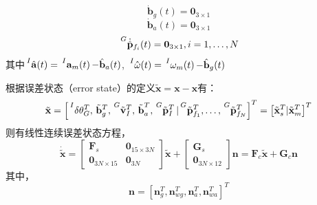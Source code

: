 \documentclass{article}
\begin{document}
\begin{equation}\label{eqs:sysmodel24}
    \dot{\mathbf{b}}_{g}(t)=\textbf{0}_{3\times 1}
\end{equation}
\begin{equation}\label{eqs:sysmodel25}
    \dot{\mathbf{b}}_{a}(t)=\textbf{0}_{3\times 1}
\end{equation}
\begin{equation}\label{eqs:sysmodel26}
    \sideset{^G}{}{\mathop{\dot{\hat{\mathbf{p}}}_{f_i}(t)}}=\textbf{0}_{3\times 1},i=1,\dots,N
\end{equation}
其中$\sideset{^I}{}{\mathop{\hat{\mathbf{a}}(t)}}=\sideset{^I}{}{\mathop{\mathbf{a}_{m}(t)}}-\hat{\mathbf{b}}_{a}(t)$,
$\sideset{^I}{}{\mathop{\hat{\mathbf{\omega}}(t)}}=\sideset{^I}{}{\mathop{\mathbf{\omega}_{m}(t)}}-\hat{\mathbf{b}}_{g}(t)$
\par
根据误差状态（error state）的定义$\tilde{\mathbf{x}}=\mathbf{x}-\hat{\mathbf{x}}$有：
\begin{equation}
    \tilde{\mathbf{x}}=\left[\sideset{^I}{}{\mathop{\delta{\mathbf{\theta}}_{G}^{T}}},
    \sideset{}{}{\mathop{\tilde{\mathbf{b}}_{g}^{T}}},
    \sideset{^G}{}{\mathop{\tilde{\textbf{v}}_{I}^{T}}},
    \sideset{}{}{\mathop{\tilde{\textbf{b}}_{a}^{T}}},
    \sideset{^G}{}{\mathop{\tilde{\textbf{p}}_{I}^{T}}}|
    \sideset{^G}{}{\mathop{\tilde{\textbf{p}}_{f_1}^{T}}},
    \dots,
    \sideset{^G}{}{\mathop{\tilde{\textbf{p}}_{f_N}^{T}}}
    \right]^T
    =\left[\tilde{\textbf{x}}_{s}^{T} | \tilde{\textbf{x}}_{m}^{T}\right]^T
\end{equation}
则有线性连续误差状态方程，
\begin{equation}
    \dot{\tilde{\mathbf{x}}}=\left[\begin{array}{cc}
        \textbf{F}_{s} &\textbf{0}_{15\times 3N}\\
        \textbf{0}_{3N\times 15} &\textbf{0}_{3N}
    \end{array}\right]\tilde{\textbf{x}}
    +\left[\begin{array}{c}
        \textbf{G}_{s}\\
        \textbf{0}_{3N\times 12}
    \end{array}\right]\textbf{n}
    =\textbf{F}_{c}\tilde{\textbf{x}}+\textbf{G}_{c}\textbf{n}
\end{equation}
其中，
\begin{equation}
    \textbf{n}=\left[\textbf{n}_{g}^{T}, \textbf{n}_{wg}^{T}, \textbf{n}_{a}^{T}, \textbf{n}_{wa}^{T}\right]^T
\end{equation}
\end{document}
